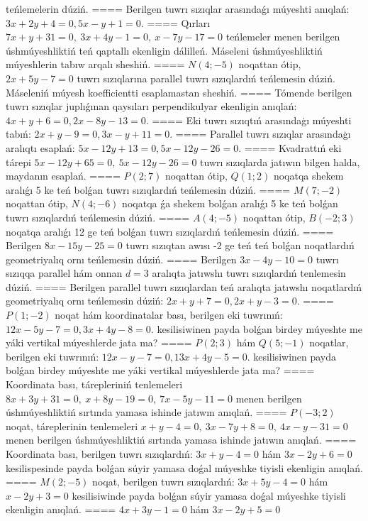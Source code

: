 teńlemelerin dúziń.
====
Berilgen tuwrı sızıqlar arasındaǵı múyeshti anıqlań: $3x+2y+4=0, 5x-y+1=0$.
====
Qırları
\(7x+y+31=0,\ 3x+4y-1=0,\ x-7y-17=0\) teńlemeler
menen berilgen úshmúyeshliktiń teń qaptallı ekenligin dálilleń.
Máseleni úshmúyeshliktiń
múyeshlerin tabıw arqalı sheshiń.
====
\(N (4;-5) \) noqattan ótip, $2x+5y-7=0$
tuwrı sızıqlarına parallel tuwrı sızıqlardıń teńlemesin dúziń. Máseleniń múyesh
koefficientti esaplamastan sheshiń.
====
Tómende berilgen tuwrı sızıqlar juplıǵınan qaysıları
perpendikulyar ekenligin anıqlań: $4x+y+6=0, 2x-8y-13=0$.
====
Eki tuwrı sızıqtıń arasındaģı múyeshti tabıń: $2x+y-9=0, 3x-y+11=0$.
====
Parallel tuwrı sızıqlar arasındaģı aralıqtı esaplań: $5x-12y+13=0, 5x-12y-26=0$.
====
Kvadrattıń eki tárepi
\(5x-12y+65=0,\ 5x-12y-26=0\) tuwrı sızıqlarda
jatıwın bilgen halda, maydanın esaplań.
====
\(P (2;7) \) noqattan ótip, \(Q (1;2) \) noqatqa shekem
aralıǵı 5 ke teń bolǵan tuwrı sızıqlardıń teńlemesin dúziń.
====
\(M (7;-2) \) noqattan ótip, \(N (4;-6) \) noqatqa
ǵa shekem bolǵan aralıǵı 5 ke teń bolǵan tuwrı sızıqlardıń teńlemesin dúziń.
====
\(A (4;-5) \) noqattan ótip, \(B (-2;3) \) noqatqa
aralıǵı 12 ge teń bolǵan tuwrı sızıqlardıń teńlemesin dúziń.
====
Berilgen \(8x-15y-25=0\) tuwrı sızıqtan awısı -2 ge teń
teń bolǵan noqatlardıń geometriyalıq ornı teńlemesin dúziń.
====
Berilgen \(3x-4y-10=0\) tuwrı sızıqqa parallel hám onnan
$d=3$ aralıqta jatıwshı tuwrı sızıqlardıń tenlemesin dúziń.
====
Berilgen parallel tuwrı sızıqlardan teń aralıqta jatıwshı
noqatlardıń geometriyalıq ornı teńlemesin dúziń: $2x+y+7=0, 2x+y-3=0$.
====
\(P (1;-2) \) noqat hám koordinatalar bası, berilgen eki
tuwrınıń: $12x-5y-7=0, 3x+4y-8=0$.
kesilisiwinen payda bolǵan birdey múyeshte me yáki vertikal
múyeshlerde jata ma?
====
\(P (2;3) \) hám \(Q (5;-1) \) noqatlar, berilgen eki
tuwrınıń: $12x-y-7=0, 13x+4y-5=0$.
kesilisiwinen payda bolǵan birdey múyeshte me yáki vertikal 
múyeshlerde jata ma?
====
Koordinata bası, tárepleriniń tenlemeleri
\(8x+3y+31=0,\ x+8y-19=0,\ 7x-5y-11=0\) menen
berilgen úshmúyeshliktiń sırtında yamasa ishinde jatıwın anıqlań.
====
\(P (−3;2) \) noqat, táreplerinin tenlemeleri
\(x+y-4=0,\ 3x-7y+8=0,\ 4x-y-31=0\) menen
berilgen úshmúyeshliktiń sırtında yamasa ishinde jatıwın anıqlań.
====
Koordinata bası, berilgen tuwrı sızıqlardıń:
\(3x+y-4=0\) hám \(3x-2y+6=0\) kesilispesinde payda 
bolǵan súyir yamasa doǵal múyeshke tiyisli ekenligin anıqlań.
====
\(M (2;-5) \) noqat, berilgen tuwrı sızıqlardıń:
\(3x+5y-4=0\) hám \(x-2y+3=0\) kesilisiwinde payda 
bolǵan súyir yamasa doǵal múyeshke tiyisli ekenligin anıqlań.
====
\(4x+3y-1=0\) hám \(3x-2y+5=0\)

